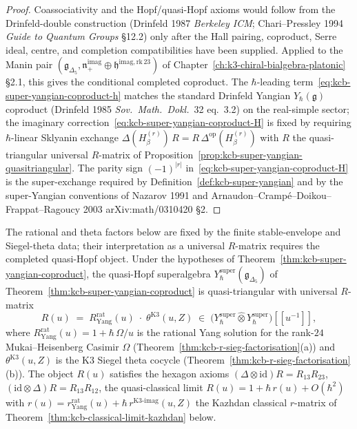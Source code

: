 \begin{proof}
Coassociativity and the Hopf/quasi-Hopf axioms would follow from the Drinfeld-double
construction (Drinfeld 1987 \emph{Berkeley ICM}; Chari--Pressley 1994
\emph{Guide to Quantum Groups} \S12.2) only after the Hall pairing,
coproduct, Serre ideal, centre, and completion compatibilities have been
supplied. Applied to the Manin pair
$(\mathfrak{g}_{\Delta_5}, \mathfrak{n}_+^{\mathrm{imag}}\oplus
\mathfrak{h}^{\mathrm{imag,rk\,23}})$ of
Chapter~\ref{ch:k3-chiral-bialgebra-platonic} \S2.1, this gives the
conditional completed coproduct. The $\hbar$-leading
term~\eqref{eq:kcb-super-yangian-coproduct-h} matches the standard
Drinfeld Yangian $Y_\hbar(\mathfrak{g})$ coproduct (Drinfeld 1985
\emph{Sov.~Math.~Dokl.}~32 eq.~3.2) on the real-simple sector; the
imaginary correction~\eqref{eq:kcb-super-yangian-coproduct-H} is
fixed by requiring $\hbar$-linear Sklyanin exchange
$\Delta(H_\beta^{(r)})\,R=R\,\Delta^{\mathrm{op}}(H_\beta^{(r)})$
with $R$ the quasi-triangular universal $R$-matrix of
Proposition~\ref{prop:kcb-super-yangian-quasitriangular}. The parity
sign $(-1)^{|r|}$ in~\eqref{eq:kcb-super-yangian-coproduct-H} is
the super-exchange required by
Definition~\ref{def:kcb-super-yangian} and by the super-Yangian
conventions of Nazarov 1991 and Arnaudon--Cramp\'e--Doikou--Frappat--Ragoucy
2003 \textup{arXiv:math/0310420} \S2.
\end{proof}

\begin{proposition}
\label{prop:kcb-super-yangian-quasitriangular}
The rational and theta factors below are fixed by the finite
stable-envelope and Siegel-theta data; their interpretation as a
universal \(R\)-matrix requires the completed quasi-Hopf object.
Under the hypotheses of
Theorem~\ref{thm:kcb-super-yangian-coproduct}, the quasi-Hopf superalgebra
$Y_\hbar^{\mathrm{super}}(\mathfrak{g}_{\Delta_5})$ of
Theorem~\ref{thm:kcb-super-yangian-coproduct} is quasi-triangular with
universal $R$-matrix
\begin{equation}
\label{eq:kcb-super-yangian-R-universal}
 R(u)
 \;=\;
 R^{\mathrm{rat}}_{\mathrm{Yang}}(u)\;\cdot\;\theta^{\mathrm{K3}}(u,Z)
 \;\in\;
 \bigl(Y_\hbar^{\mathrm{super}}\widehat{\otimes}
 Y_\hbar^{\mathrm{super}}\bigr)[[u^{-1}]],
\end{equation}
where $R^{\mathrm{rat}}_{\mathrm{Yang}}(u)=1+\hbar\,\Omega/u$ is the
rational Yang solution for the rank-$24$ Mukai--Heisenberg Casimir
$\Omega$ (Theorem~\ref{thm:kcb-r-sieg-factorisation}(a)) and
$\theta^{\mathrm{K3}}(u,Z)$ is the K3 Siegel theta cocycle
(Theorem~\ref{thm:kcb-r-sieg-factorisation}(b)). The object $R(u)$
satisfies the hexagon axioms
$(\Delta\otimes\mathrm{id})R = R_{13}R_{23}$,
$(\mathrm{id}\otimes\Delta)R = R_{13}R_{12}$, the quasi-classical
limit $R(u) = 1 + \hbar\,r(u) + O(\hbar^2)$ with
$r(u) = r^{\mathrm{rat}}_{\mathrm{Yang}}(u) +
\hbar\,r^{\mathrm{K3\text{-}imag}}(u,Z)$ the Kazhdan classical
$r$-matrix of Theorem~\ref{thm:kcb-classical-limit-kazhdan} below.
\end{proposition}


